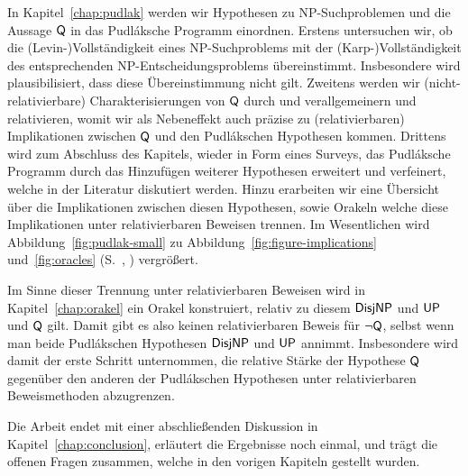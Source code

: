 In Kapitel~\ref{chap:pudlak} werden wir Hypothesen zu NP-Suchproblemen und die Aussage $\mathsf{Q}$ in das Pudláksche Programm einordnen. Erstens untersuchen wir, ob die (Levin-)Vollständigkeit eines NP-Suchproblems  mit der (Karp-)Vollständigkeit des entsprechenden NP-Entscheidungsproblems übereinstimmt. Insbesondere wird plausibilisiert, dass diese Übereinstimmung nicht gilt.
Zweitens werden wir (nicht-relativierbare) Charakterisierungen von $\mathsf{Q}$ durch \textcite{fenner_inverting_2003} und \textcite{kobler_is_2000} verallgemeinern und relativieren, womit wir als Nebeneffekt auch präzise zu (relativierbaren) Implikationen zwischen $\mathsf{Q}$ und den Pudlákschen Hypothesen kommen.
Drittens wird zum Abschluss des Kapitels, wieder in Form eines Surveys, das Pudláksche Programm durch das Hinzufügen weiterer Hypothesen erweitert und verfeinert, welche in der Literatur diskutiert werden.
Hinzu erarbeiten wir eine Übersicht über die Implikationen zwischen diesen Hypothesen, sowie Orakeln welche diese Implikationen unter relativierbaren Beweisen trennen. Im Wesentlichen wird Abbildung~\ref{fig:pudlak-small} zu Abbildung~\ref{fig:figure-implications} und~\ref{fig:oracles} (S.~\pageref{fig:figure-implications}, \pageref{fig:oracles}) vergrößert.

Im Sinne dieser Trennung unter relativierbaren Beweisen wird in Kapitel~\ref{chap:orakel} ein Orakel konstruiert, relativ zu diesem $\mathsf{DisjNP}$ und $\mathsf{UP}$ und $\mathsf{Q}$ gilt. Damit gibt es also keinen relativierbaren Beweis für $\neg\mathsf{Q}$, selbst wenn man beide Pudlákschen Hypothesen $\mathsf{DisjNP}$ und $\mathsf{UP}$ annimmt. Insbesondere wird damit der erste Schritt unternommen, die relative Stärke der Hypothese $\mathsf{Q}$ gegenüber den anderen der Pudlákschen Hypothesen unter relativierbaren Beweismethoden abzugrenzen. 

Die Arbeit endet mit einer abschließenden Diskussion in Kapitel~\ref{chap:conclusion}, erläutert die Ergebnisse noch einmal, und trägt die offenen Fragen zusammen, welche in den vorigen Kapiteln gestellt wurden.




